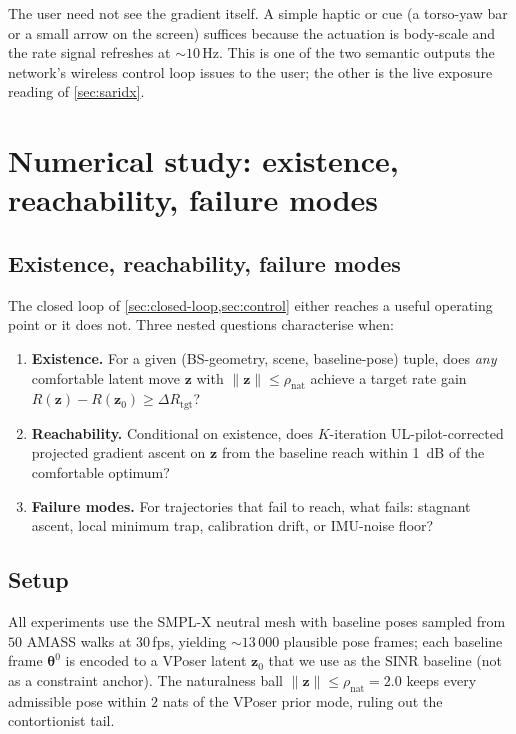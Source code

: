 \documentclass[journal,twocolumn,10pt]{IEEEtran}
\theoremstyle{plain}
\theoremstyle{definition}
\theoremstyle{remark}
\newcommand{\thetab}{\bm{\theta}}
\begin{document}
The user need not see the gradient itself. A simple haptic or
cue (a torso-yaw bar or a small arrow on the screen) suffices
because the actuation is body-scale and the rate signal refreshes at
$\sim 10\,$Hz. This is one of the two semantic outputs the
network's wireless control loop issues to the user; the other is
the live exposure reading of \cref{sec:saridx}.


\section{Numerical study: existence, reachability, failure modes}\label{sec:numerical}

\subsection{Existence, reachability, failure modes}

The closed loop of \cref{sec:closed-loop,sec:control} either reaches
a useful operating point or it does not. Three nested questions
characterise when:
\begin{enumerate}
\item[\textbf{(E)}] \textbf{Existence.} For a given (BS-geometry,
scene, baseline-pose) tuple, does \emph{any} comfortable latent
move $\bm{z}$ with $\|\bm{z}\| \leq \rho_\mathrm{nat}$ achieve a
target rate gain $R(\bm{z}) - R(\bm{z}_0) \geq \Delta R_{\mathrm{tgt}}$?
\item[\textbf{(R)}] \textbf{Reachability.} Conditional on existence,
does $K$-iteration UL-pilot-corrected projected gradient ascent
on $\bm{z}$ from the baseline reach within 1~dB of the comfortable
optimum?
\item[\textbf{(F)}] \textbf{Failure modes.} For trajectories that
fail to reach, what fails: stagnant ascent, local minimum trap,
calibration drift, or IMU-noise floor?
\end{enumerate}

\subsection{Setup}

All experiments use the SMPL-X neutral mesh with baseline poses
sampled from $50$ AMASS walks at $30\,$fps, yielding $\sim\!13\,000$
plausible pose frames; each baseline frame $\thetab^{0}$ is encoded
to a VPoser latent $\bm{z}_0$ that we use as the SINR baseline (not
as a constraint anchor). The naturalness ball
$\|\bm{z}\| \leq \rho_\mathrm{nat} = 2.0$ keeps every admissible
pose within $2$ nats of the VPoser prior mode, ruling out the
contortionist tail.
\end{document}
